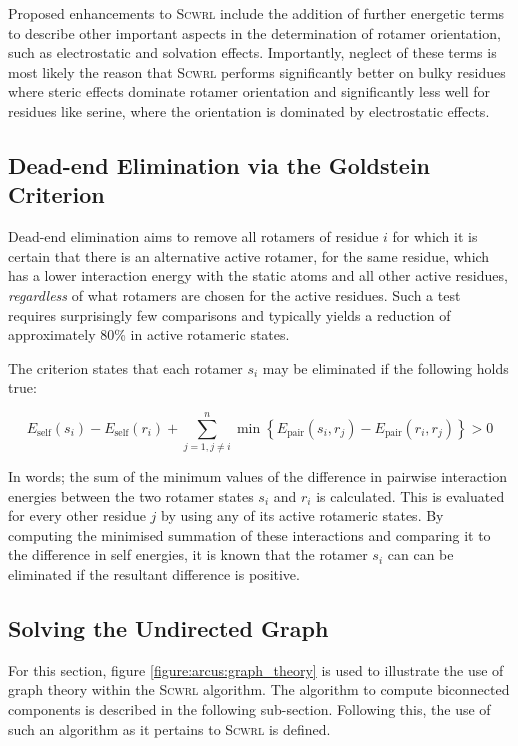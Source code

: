 Proposed enhancements to \textsc{Scwrl} include the addition of further energetic terms to describe other important aspects in the determination of rotamer orientation, such as electrostatic and solvation effects. Importantly, neglect of these terms is most likely the reason that \textsc{Scwrl} performs significantly better on bulky residues where steric effects dominate rotamer orientation and significantly less well for residues like serine, where the orientation is dominated by electrostatic effects\cite{METHOD:SCWRL_2}.

\subsection{Dead-end Elimination via the Goldstein Criterion}

Dead-end elimination aims to remove all rotamers of residue $i$ for which it is certain that there is an alternative active rotamer, for the same residue, which has a lower interaction energy with the static atoms and all other active residues, \emph{regardless} of what rotamers are chosen for the active residues. Such a test requires surprisingly few comparisons and typically yields a reduction of approximately 80\% in active rotameric states.

The criterion states that each rotamer $s_i$ may be eliminated if the following holds true:

\begin{equation}
E_\text{self}(s_i)- E_\text{self}(r_i)+ \sum_{j=1,j\neq i}^{n}  \min \left\{ E_{\text{pair}}(s_i,r_j) -   E_{\text{pair}}(r_i,r_j) \right\}  >  0 
\end{equation}

In words; the sum of the minimum values of the difference in pairwise interaction energies
between the two rotamer states $s_i$ and $r_i$ is calculated. This is evaluated for every other residue $j$ by using any of its active rotameric states. By computing the minimised summation of these interactions and comparing it to the difference in self energies, it is known that the rotamer $s_i$ can can be eliminated if the resultant difference is positive. 

\subsection{Solving the Undirected Graph}
\label{section:arcus:graph_theory}

For this section, figure \ref{figure:arcus:graph_theory} is used to illustrate the use of graph theory within the \textsc{Scwrl} algorithm. The algorithm to compute biconnected components is described in the following sub-section. Following this, the use of such an algorithm as it pertains to \textsc{Scwrl} is defined.

